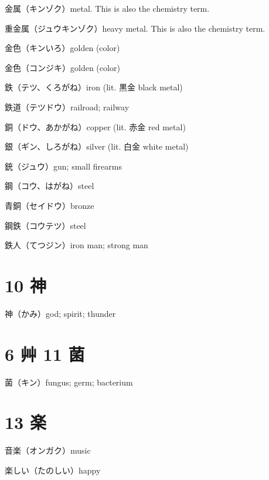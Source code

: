 金属（キンゾク）metal. This is also the chemistry term.

重金属（ジュウキンゾク）heavy metal. This is also the chemistry term.

金色（キンいろ）golden (color)

金色（コンジキ）golden (color)

鉄（テツ、くろがね）iron (lit. 黒金 black metal)

鉄道（テツドウ）railroad; railway

銅（ドウ、あかがね）copper (lit. 赤金 red metal)

銀（ギン、しろがね）silver (lit. 白金 white metal)

銃（ジュウ）gun; small firearms

鋼（コウ、はがね）steel

青銅（セイドウ）bronze

鋼鉄（コウテツ）steel

鉄人（てつジン）iron man; strong man

\section{10 神}

神（かみ）god; spirit; thunder

\section{6 艸 11 菌}

菌（キン）fungus; germ; bacterium

\section{13 楽}

音楽（オンガク）music

楽しい（たのしい）happy
